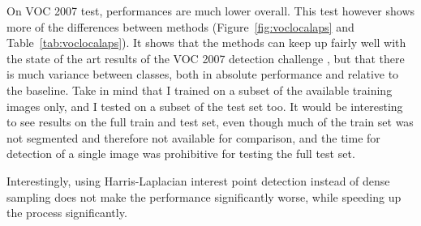 On VOC 2007 test, performances are much lower overall. This test however shows more of the differences between methods (Figure~\ref{fig:voclocalaps} and Table~\ref{tab:voclocalaps}). It shows that the methods can keep up fairly well with the state of the art results of the VOC 2007 detection challenge \cite{pascal-voc-2007}, but that there is much variance between classes, both in absolute performance and relative to the baseline. Take in mind that I trained on a subset of the available training images only, and I tested on a subset of the test set too. It would be interesting to see results on the full train and test set, even though much of the train set was not segmented and therefore not available for comparison, and the time for detection of a single image was prohibitive for testing the full test set.

Interestingly, using Harris-Laplacian interest point detection instead of dense sampling does not make the performance significantly worse, while speeding up the process significantly.

